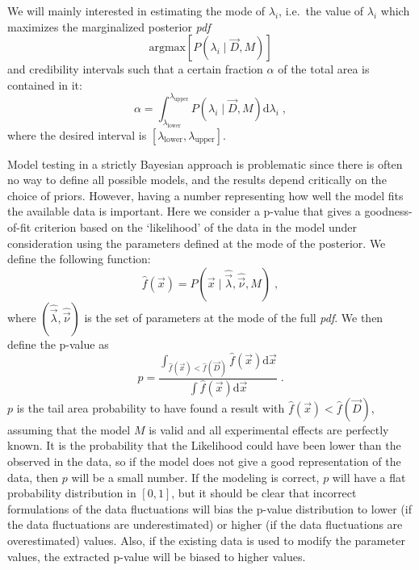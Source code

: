 We will mainly interested in estimating the mode of $\lambda_i$, i.e.~the value of $\lambda_i$ which maximizes the marginalized posterior \emph{pdf}
\begin{equation}\text{argmax}\left[ P(\lambda_i\mid\vec{D},M) \right]\end{equation}
and credibility intervals such that a certain fraction $\alpha$ of the total area is contained in it:
\begin{equation}\alpha=\int^{\lambda_\text{upper}}_{\lambda_\text{lower}}P(\lambda_i\mid\vec{D},M)\text{d}\lambda_i\;,\end{equation}
where the desired interval is $[\lambda_\text{lower},\lambda_\text{upper}]$.

 Model testing in a strictly Bayesian approach is problematic since there is often no way to define all possible models, and the results depend critically on the choice of priors. However, having a number representing how well the model fits the available data is important. Here we consider a p-value that gives a goodness-of-fit criterion based on the `likelihood' of the data in the model under consideration using the parameters defined at the mode of the posterior. We define the following function:
\begin{equation}\hat{f}(\vec{x})=P(\vec{x}\mid\hat{\vec{\lambda}},\hat{\vec{\nu}},M)\;,\end{equation}
where $(\hat{\vec{\lambda}},\hat{\vec{\nu}})$ is the set of parameters at the mode of the full \emph{pdf}. We then define the p-value as
\begin{equation}p=\frac{\int_{\hat{f}(\vec{x})<\hat{f}(\vec{D})}\hat{f}(\vec{x})\text{d}\vec{x}}{\int \hat{f}(\vec{x})\text{d}\vec{x}}\;.\label{eq:pvalue}\end{equation}
$p$ is the tail area probability to have found a result with $\hat{f}(\vec{x})<\hat{f}(\vec{D})$, assuming that the model $M$ is valid and all experimental effects are perfectly known. It is the probability that the Likelihood could have been lower than the observed in the data, so if the model does not give a good representation of the data, then $p$ will be a small number. If the modeling is correct, $p$ will have a flat probability distribution in $[0,1]$, but it should be clear that incorrect formulations of the data fluctuations will bias the p-value distribution to lower (if the data fluctuations are underestimated) or higher (if the data fluctuations are overestimated) values. Also, if the existing data is used to modify the parameter values, the extracted p-value will be biased to higher values.

